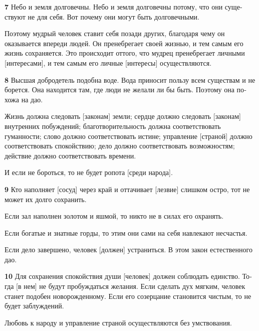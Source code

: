 \documentclass[a4paper]{article}
\begin{document}
{\ttfamily
\foreignlanguage{russian}{\textrm{\textbf{7}}}\foreignlanguage{russian}{\textrm{ Небо и земля долговечны. Небо и земля
долговечны потому, что они существуют не для себя. Вот почему они могут быть долговечными.}}}

{
Поэтому мудрый человек ставит себя позади других, благодаря чему он оказывается впереди людей. Он пренебрегает своей
жизнью, и тем самым его жизнь сохраняется. Это происходит оттого, что мудрец пренебрегает личными [интересами], и тем
самым его личные [интересы] осуществляются.}

{\ttfamily
\foreignlanguage{russian}{\textrm{\textbf{8}}}\foreignlanguage{russian}{\textrm{ Высшая добродетель подобна воде. Вода
приносит пользу всем существам и не борется. Она находится там, где люди не желали ли бы быть. Поэтому она похожа на
дао.}}}

{
Жизнь должна следовать [законам] земли; сердце должно следовать [законам] внутренних побуждений; благотворительность
должна соответствовать гуманности; слово должно соответствовать истине; управление [страной] должно соответствовать
спокойствию; дело должно соответствовать возможностям; действие должно соответствовать времени.}

{
И если не бороться, то не будет ропота [среди народа].}

{\ttfamily
\foreignlanguage{russian}{\textrm{\textbf{9}}}\foreignlanguage{russian}{\textrm{ Кто наполняет [сосуд] через край и
оттачивает [лезвие] слишком остро, тот не может их долго сохранить.}}}

{
Если зал наполнен золотом и яшмой, то никто не в силах его охранять.}

{
Если богатые и знатные горды, то этим они сами на себя навлекают несчастья.}

{
Если дело завершено, человек [должен] устраниться. В этом закон естественного дао.}

{\ttfamily
\foreignlanguage{russian}{\textrm{\textbf{10}}}\foreignlanguage{russian}{\textrm{ Для сохранения спокойствия души
[человек] должен соблюдать единство. Тогда [в нем] не будут пробуждаться желания. Если сделать дух мягким, человек
станет подобен новорожденному. Если его созерцание становится чистым, то не будет заблуждений.}}}

{
Любовь к народу и управление страной осуществляются без умствования.}
\end{document}
